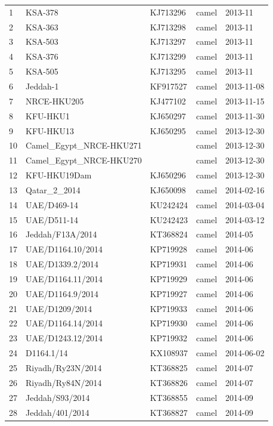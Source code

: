 \documentclass[11pt,oneside,letterpaper]{article}
\begin{document}
\begin{longtable}{ | l | l | l | l | l | }
  1 & KSA-378 & KJ713296 & camel & 2013-11 \\
  2 & KSA-363 & KJ713298 & camel & 2013-11 \\
  3 & KSA-503 & KJ713297 & camel & 2013-11 \\
  4 & KSA-376 & KJ713299 & camel & 2013-11 \\
  5 & KSA-505 & KJ713295 & camel & 2013-11 \\
  6 & Jeddah-1 & KF917527 & camel & 2013-11-08 \\
  7 & NRCE-HKU205 & KJ477102 & camel & 2013-11-15 \\
  8 & KFU-HKU1 & KJ650297 & camel & 2013-11-30 \\
  9 & KFU-HKU13 & KJ650295 & camel & 2013-12-30 \\
  10 & Camel\_Egypt\_NRCE-HKU271 &  & camel & 2013-12-30 \\
  11 & Camel\_Egypt\_NRCE-HKU270 &  & camel & 2013-12-30 \\
  12 & KFU-HKU19Dam & KJ650296 & camel & 2013-12-30 \\
  13 & Qatar\_2\_2014 & KJ650098 & camel & 2014-02-16 \\
  14 & UAE/D469-14 & KU242424 & camel & 2014-03-04 \\
  15 & UAE/D511-14 & KU242423 & camel & 2014-03-12 \\
  16 & Jeddah/F13A/2014 & KT368824 & camel & 2014-05 \\
  17 & UAE/D1164.10/2014 & KP719928 & camel & 2014-06 \\
  18 & UAE/D1339.2/2014 & KP719931 & camel & 2014-06 \\
  19 & UAE/D1164.11/2014 & KP719929 & camel & 2014-06 \\
  20 & UAE/D1164.9/2014 & KP719927 & camel & 2014-06 \\
  21 & UAE/D1209/2014 & KP719933 & camel & 2014-06 \\
  22 & UAE/D1164.14/2014 & KP719930 & camel & 2014-06 \\
  23 & UAE/D1243.12/2014 & KP719932 & camel & 2014-06 \\
  24 & D1164.1/14 & KX108937 & camel & 2014-06-02 \\
  25 & Riyadh/Ry23N/2014 & KT368825 & camel & 2014-07 \\
  26 & Riyadh/Ry84N/2014 & KT368826 & camel & 2014-07 \\
  27 & Jeddah/S93/2014 & KT368855 & camel & 2014-09 \\
  28 & Jeddah/401/2014 & KT368827 & camel & 2014-09 \\

\end{longtable}
\end{document}
